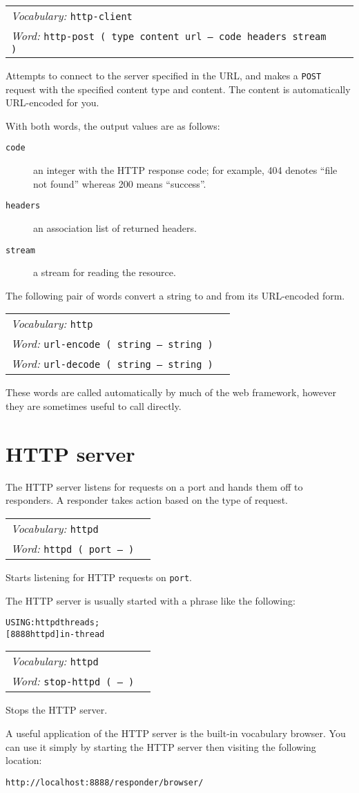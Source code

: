\documentclass{book}
\newcommand{\vocabulary}[1]{\emph{Vocabulary:} \texttt{#1}&\\}
\newcommand{\ordinaryword}[2]{\index{\texttt{#1}}\emph{Word:} \texttt{#2}&\\}
\newcommand{\wordtable}[1]{


\begin{tabularx}{12cm}{lX}
\hline
#1
\hline
\end{tabularx}

}
\begin{document}
\wordtable{
\vocabulary{http-client}
\ordinaryword{http-post}{http-post ( type content url -- code headers stream )}
}
Attempts to connect to the server specified in the URL, and makes a \verb|POST| request with the specified content type and content. The content is automatically URL-encoded for you.

With both words, the output values are as follows:
\begin{description}
\item[\texttt{code}] an integer with the HTTP response code; for example, 404 denotes ``file not found'' whereas 200 means ``success''.
\item[\texttt{headers}] an association list of returned headers.
\item[\texttt{stream}] a stream for reading the resource.
\end{description}

The following pair of words convert a string to and from its URL-encoded form.

\wordtable{
\vocabulary{http}
\ordinaryword{url-encode}{url-encode ( string -- string )}
\ordinaryword{url-decode}{url-decode ( string -- string )}
}
These words are called automatically by much of the web framework, however they are sometimes useful to call directly.

\section{HTTP server}\label{httpd}

The HTTP server listens for requests on a port and hands them off to responders. A responder takes action based on the type of request.

\wordtable{
\vocabulary{httpd}
\ordinaryword{httpd}{httpd ( port -- )}
}
Starts listening for HTTP requests on \verb|port|.

The HTTP server is usually started with a phrase like the following:
\begin{alltt}
  USING: httpd threads ;
  [ 8888 httpd ] in-thread
\end{alltt}

\wordtable{
\vocabulary{httpd}
\ordinaryword{stop-httpd}{stop-httpd ( -- )}
}
Stops the HTTP server.

A useful application of the HTTP server is the built-in vocabulary browser. You can use it simply by starting the HTTP server then visiting the following location:

\begin{verbatim}
http://localhost:8888/responder/browser/
\end{verbatim}
\end{document}
